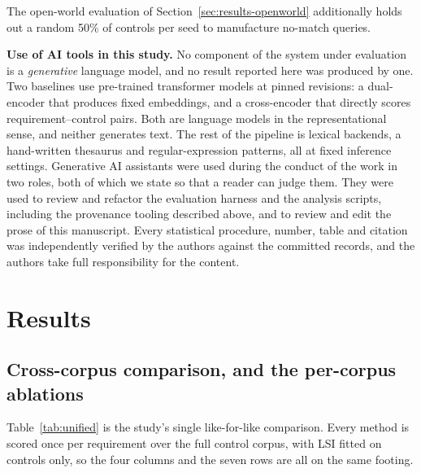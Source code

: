 \documentclass[smallextended,natbib]{svjour3}
\begin{document}
The open-world evaluation of Section~\ref{sec:results-openworld} additionally holds out a random 50\% of controls per seed to manufacture no-match queries.

\medskip\noindent\textbf{Use of AI tools in this study.} No component of the system under evaluation is a \emph{generative} language model, and no result reported here was produced by one. Two baselines use pre-trained transformer models at pinned revisions: a dual-encoder that produces fixed embeddings, and a cross-encoder that directly scores requirement--control pairs. Both are language models in the representational sense, and neither generates text. The rest of the pipeline is lexical backends, a hand-written thesaurus and regular-expression patterns, all at fixed inference settings. Generative AI assistants were used during the conduct of the work in two roles, both of which we state so that a reader can judge them. They were used to review and refactor the evaluation harness and the analysis scripts, including the provenance tooling described above, and to review and edit the prose of this manuscript. Every statistical procedure, number, table and citation was independently verified by the authors against the committed records, and the authors take full responsibility for the content.


\section{Results}
\label{sec:results}

\subsection{Cross-corpus comparison, and the per-corpus ablations}
\label{sec:results-unified}

Table~\ref{tab:unified} is the study's single like-for-like comparison. Every method is scored once per requirement over the full control corpus, with LSI fitted on controls only, so the four columns and the seven rows are all on the same footing.
\end{document}
